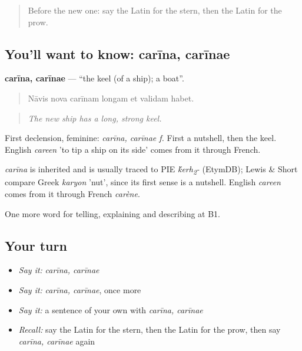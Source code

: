 \begin{quote}
Before the new one: say the Latin for the stern, then the Latin for the prow.
\end{quote}

\subsection*{You'll want to know: carīna, carīnae}
\textbf{carīna, carīnae} — \textquotedblleft{}the keel (of a ship); a boat\textquotedblright{}.

\begin{quote}
Nāvis nova carīnam longam et validam habet.
\end{quote}

\begin{quote}
\emph{The new ship has a long, strong keel.}
\end{quote}

First declension, feminine: \emph{carīna, carīnae f.} First a nutshell, then the keel. English \emph{careen} 'to tip a ship on its side' comes from it through French.

\begin{cousinweb}
\emph{carīna} is inherited and is usually traced to PIE \emph{\'{k}erh\textsubscript{2}-} (EtymDB); Lewis \& Short compare Greek \emph{karyon} 'nut', since its first sense is a nutshell. English \emph{careen} comes from it through French \emph{carène}.
\end{cousinweb}

\begin{grammarlens}[title={What you've built}]
One more word for telling, explaining and describing at B1.
\end{grammarlens}

\subsection*{Your turn}
\begin{itemize}
\raggedright
  \item \emph{Say it:} \emph{carīna, carīnae}
  \item \emph{Say it:} \emph{carīna, carīnae}, once more
  \item \emph{Say it:} a sentence of your own with \emph{carīna, carīnae}
  \item \emph{Recall:} say the Latin for the stern, then the Latin for the prow, then say \emph{carīna, carīnae} again
\end{itemize}

